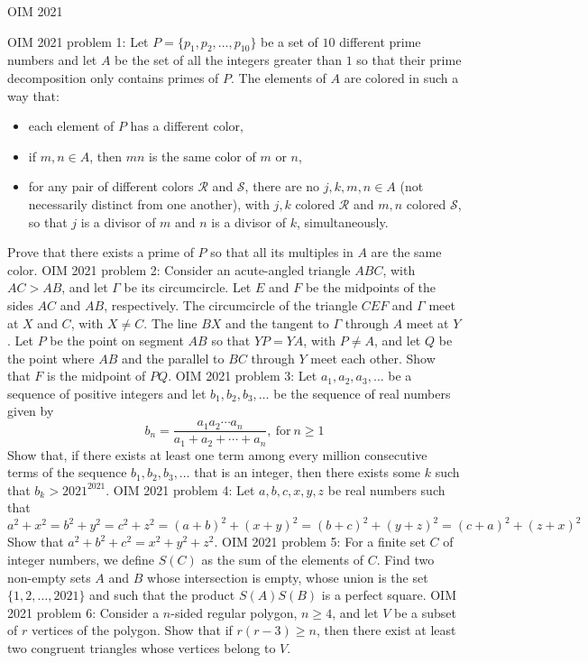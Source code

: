 
OIM 2021 

OIM 2021 problem 1:  Let $P = \{p_1,p_2,\ldots, p_{10}\}$ be a set of $10$ different prime numbers and let $A$ be the set of all the integers greater than $1$ so that their prime decomposition only contains primes of $P$. The elements of $A$ are colored in such a way that:
\begin{itemize}
  \item each element of $P$ has a different color,
  \item if $m,n \in A$, then $mn$ is the same color of $m$ or $n$,
  \item for any pair of different colors $\mathcal{R}$ and $\mathcal{S}$, there are no $j,k,m,n\in A$ (not necessarily distinct from one another), with $j,k$ colored $\mathcal{R}$ and $m,n$ colored $\mathcal{S}$, so that $j$ is a divisor of $m$ and $n$ is a divisor of $k$, simultaneously.
\end{itemize}
Prove that there exists a prime of $P$ so that all its multiples in $A$ are the same color. 
OIM 2021 problem 2:  Consider an acute-angled triangle $ABC$, with $AC>AB$, and let $\Gamma$ be its circumcircle. Let $E$ and $F$ be the midpoints of the sides $AC$ and $AB$, respectively. The circumcircle of the triangle $CEF$ and $\Gamma$ meet at $X$ and $C$, with $X\neq C$. The line $BX$ and the tangent to $\Gamma$ through $A$ meet at $Y$. Let $P$ be the point on segment $AB$ so that $YP = YA$, with $P\neq A$, and let $Q$ be the point where $AB$ and the parallel to $BC$ through $Y$ meet each other. Show that $F$ is the midpoint of $PQ$. 
OIM 2021 problem 3:  Let $a_1,a_2,a_3, \ldots$ be a sequence of positive integers and let $b_1,b_2,b_3,\ldots$ be the sequence of real numbers given by
\[ b_n = \dfrac{a_1a_2\cdots a_n}{a_1+a_2+\cdots + a_n},\ \mbox{for}\ n\geq 1 \]
Show that, if there exists at least one term among every million consecutive terms of the sequence $b_1,b_2,b_3,\ldots$ that is an integer, then there exists some $k$ such that $b_k > 2021^{2021}$. 
OIM 2021 problem 4:  Let $a,b,c,x,y,z$ be real numbers such that
\[ a^2+x^2=b^2+y^2=c^2+z^2=(a+b)^2+(x+y)^2=(b+c)^2+(y+z)^2=(c+a)^2+(z+x)^2 \]
Show that $a^2+b^2+c^2=x^2+y^2+z^2$. 
OIM 2021 problem 5:  For a finite set $C$ of integer numbers, we define $S(C)$ as the sum of the elements of $C$. Find two non-empty sets $A$ and $B$ whose intersection is empty, whose union is the set $\{1,2,\ldots, 2021\}$ and such that the product $S(A)S(B)$ is a perfect square. 
OIM 2021 problem 6:  Consider a $n$-sided regular polygon, $n \geq 4$, and let $V$ be a subset of $r$ vertices of the polygon. Show that if $r(r-3) \geq n$, then there exist at least two congruent triangles whose vertices belong to $V$. 

